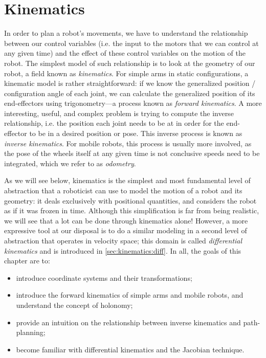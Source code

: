 \chapter{Kinematics}\label{chap:kinematics}

In order to plan a robot's movements, we have to understand the relationship between our control variables (i.e. the input to the motors that we can control at any given time) and the effect of these control variables on the motion of the robot.
The simplest model of such relationship is to look at the geometry of our robot, a field known as \textsl{kinematics}.
For simple arms in static configurations, a kinematic model is rather straightforward: if we know the generalized position / configuration angle of each joint, we can calculate the generalized position of its end-effectors using trigonometry---a process known as \textsl{forward kinematics}.
A more interesting, useful, and complex problem is trying to compute the inverse relationship, i.e. the position each joint needs to be at in order for the end-effector to be in a desired position or pose. This inverse process is known as \textsl{inverse kinematics}.
For mobile robots, this process is usually more involved, as the pose of the wheels itself at any given time is not conclusive speeds need to be integrated, which we refer to as \textsl{odometry}.

As we will see below, kinematics is the simplest and most fundamental level of abstraction that a roboticist can use to model the motion of a robot and its geometry: it deals exclusively with positional quantities, and considers the robot as if it was frozen in time. Although this simplification is far from being realistic, we will see that a lot can be done through kinematics alone! However, a more expressive tool at our disposal is to do a similar modeling in a second level of abstraction that operates in velocity space; this domain is called \textsl{differential kinematics} and is introduced in \cref{sec:kinematics:diff}.
In all, the goals of this chapter are to:

\begin{itemize}
\item introduce coordinate systems and their transformations;
\item introduce the forward kinematics of simple arms and mobile robots, and understand the concept of holonomy;
\item provide an intuition on the relationship between inverse kinematics and path-planning;
\item become familiar with differential kinematics and the Jacobian technique.
\end{itemize}

